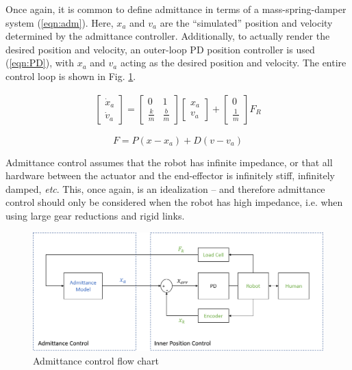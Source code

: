 \documentclass[12pt]{report}
\begin{document}
	Once again, it is common to define admittance in terms of a mass-spring-damper system (\ref{eqn:adm}). Here, $x_a$ and $v_a$ are the ``simulated'' position and velocity determined by the admittance controller. Additionally, to actually render the desired position and velocity, an outer-loop PD position controller is used (\ref{eqn:PD}), with $x_a$ and $v_a$ acting as the desired position and velocity. The entire control loop is shown in Fig. \ref{fig:adm_diagram}.
	
	\begin{gather} \label{eqn:adm}
	\begin{bmatrix}
    	\dot{x}_a \\
    	\dot{v}_a 
    \end{bmatrix} 
    =
    \begin{bmatrix}
    	0 & 1 \\
    	\frac{k}{m} & \frac{b}{m}
    \end{bmatrix} 
    \begin{bmatrix}
    	x_a \\
    	v_a
    \end{bmatrix}  
    +
    \begin{bmatrix}
    	0 \\
    	\frac{1}{m}
    \end{bmatrix}
    F_R   	
	\end{gather}
	
	\begin{equation} \label{eqn:PD}
	F = P(x - x_a) + D(v - v_a)
	\end{equation}

	Admittance control assumes that the robot has infinite impedance, or that all hardware between the actuator and the end-effector is infinitely stiff, infinitely damped, \textit{etc}. This, once again, is an idealization -- and therefore admittance control should only be considered when the robot has high impedance, i.e. when using large gear reductions and rigid links. 
	
		\begin{figure}[h] 
		\centering
		\includegraphics[width=\linewidth]{admittance_diagram}
		\caption{Admittance control flow chart}
		\label{fig:adm_diagram}
	\end{figure}
	
\end{document}
